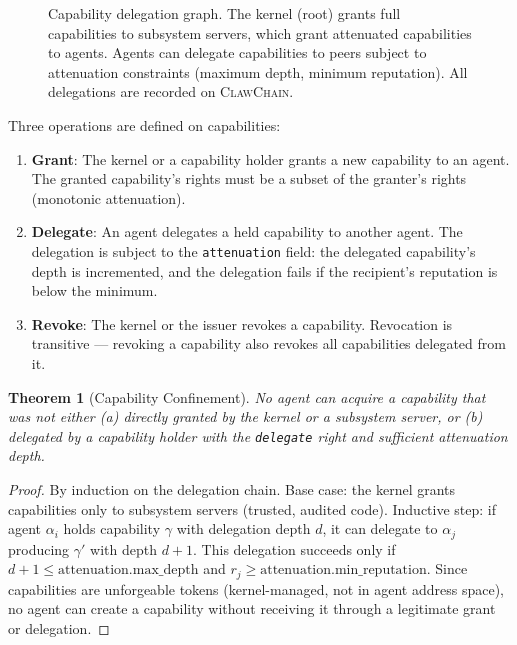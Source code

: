 \documentclass{article}
\newtheorem{theorem}{Theorem}
\newcommand{\clawchain}{\textsc{ClawChain}}
\begin{document}
\begin{figure}[t]
\caption{Capability delegation graph. The kernel (root) grants full capabilities to subsystem servers, which grant attenuated capabilities to agents. Agents can delegate capabilities to peers subject to attenuation constraints (maximum depth, minimum reputation). All delegations are recorded on \clawchain{}.}
\label{fig:capabilities}
\end{figure}

Three operations are defined on capabilities:

\begin{enumerate}[leftmargin=*]
    \item \textbf{Grant}: The kernel or a capability holder grants a new capability to an agent. The granted capability's rights must be a subset of the granter's rights (monotonic attenuation).
    
    \item \textbf{Delegate}: An agent delegates a held capability to another agent. The delegation is subject to the \texttt{attenuation} field: the delegated capability's depth is incremented, and the delegation fails if the recipient's reputation is below the minimum.
    
    \item \textbf{Revoke}: The kernel or the issuer revokes a capability. Revocation is transitive — revoking a capability also revokes all capabilities delegated from it.
\end{enumerate}

\begin{theorem}[Capability Confinement]
\label{thm:confinement}
No agent can acquire a capability that was not either (a) directly granted by the kernel or a subsystem server, or (b) delegated by a capability holder with the \texttt{delegate} right and sufficient attenuation depth.
\end{theorem}

\begin{proof}
By induction on the delegation chain. Base case: the kernel grants capabilities only to subsystem servers (trusted, audited code). Inductive step: if agent $\alpha_i$ holds capability $\gamma$ with delegation depth $d$, it can delegate to $\alpha_j$ producing $\gamma'$ with depth $d+1$. This delegation succeeds only if $d+1 \leq \text{attenuation.max\_depth}$ and $r_j \geq \text{attenuation.min\_reputation}$. Since capabilities are unforgeable tokens (kernel-managed, not in agent address space), no agent can create a capability without receiving it through a legitimate grant or delegation.
\end{proof}
\end{document}
